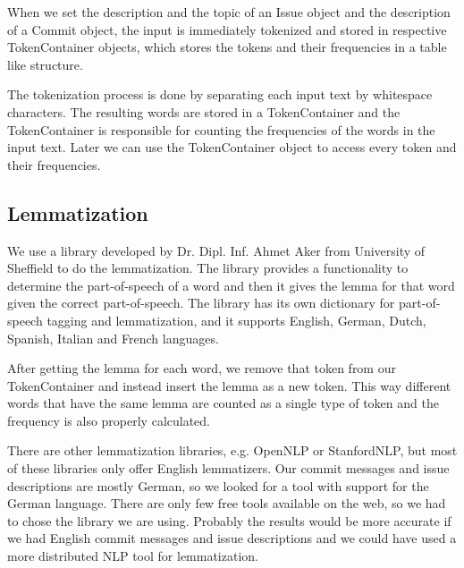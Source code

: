 When we set the description and the topic of an Issue object and the description of a Commit object, the input is immediately tokenized and stored in respective TokenContainer objects, which stores the tokens and their frequencies in a table like structure.

The tokenization process is done by separating each input text by whitespace characters. The resulting words are stored in a TokenContainer and the TokenContainer is responsible for counting the frequencies of the words in the input text. Later we can use the TokenContainer object to access every token and their frequencies.


\subsection{Lemmatization}

We use a library developed by Dr. Dipl. Inf. Ahmet Aker from University of Sheffield to do the lemmatization. The library provides a functionality to determine the part-of-speech of a word and then it gives the lemma for that word given the correct part-of-speech. The library has its own dictionary for part-of-speech tagging and lemmatization, and it supports English, German, Dutch, Spanish, Italian and French languages.

After getting the lemma for each word, we remove that token from our TokenContainer and instead insert the lemma as a new token. This way different words that have the same lemma are counted as a single type of token and the frequency is also properly calculated.

There are other lemmatization libraries, e.g. OpenNLP or StanfordNLP, but most of these libraries only offer English lemmatizers. Our commit messages and issue descriptions are mostly German, so we looked for a tool with support for the German language. There are only few free tools available on the web, so we had to chose the library we are using. Probably the results would be more accurate if we had English commit messages and issue descriptions and we could have used a more distributed NLP tool for lemmatization.
